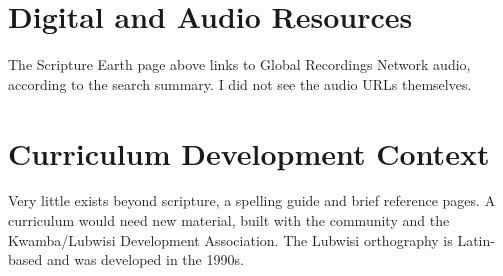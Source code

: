 \documentclass[12pt]{article}
\begin{document}
\section{Digital and Audio Resources}
The Scripture Earth page above links to Global Recordings Network audio, according to the search summary. I did not see the audio URLs themselves.

\section{Curriculum Development Context}
Very little exists beyond scripture, a spelling guide and brief reference pages. A curriculum would need new material, built with the community and the Kwamba/Lubwisi Development Association. The Lubwisi orthography is Latin-based and was developed in the 1990s.
\end{document}

